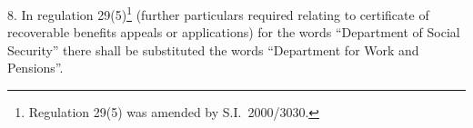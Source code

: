 \documentclass[12pt,a4paper]{article}
\begin{document}
\medskip

8.  In regulation 29(5)\footnote{Regulation 29(5) was amended by S.I.\ 2000/3030.} (further particulars required relating to certificate of recoverable benefits appeals or applications) for the words “Department of Social Security” there shall be substituted the words “Department for Work and Pensions”.

%
%
%


\medskip
\end{document}
